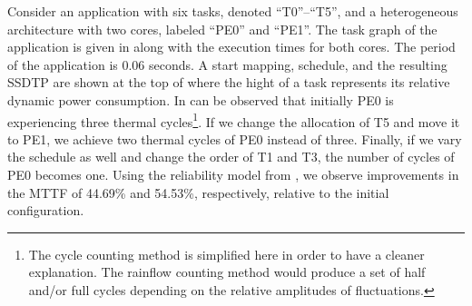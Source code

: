 Consider an application with six tasks, denoted ``T0''--``T5'', and a heterogeneous architecture with two cores, labeled ``PE0'' and ``PE1''. The task graph of the application is given in  along with the execution times for both cores. The period of the application is 0.06 seconds. A start mapping, schedule, and the resulting SSDTP are shown at the top of  where the hight of a task represents its relative dynamic power consumption. In can be observed that initially PE0 is experiencing three thermal cycles\footnote{The cycle counting method is simplified here in order to have a cleaner explanation. The rainflow counting method \cite{xiang2010} would produce a set of half and/or full cycles depending on the relative amplitudes of fluctuations.}. If we change the allocation of T5 and move it to PE1, we achieve two thermal cycles of PE0 instead of three. Finally, if we vary the schedule as well and change the order of T1 and T3, the number of cycles of PE0 becomes one. Using the reliability model from , we observe improvements in the MTTF of 44.69\% and 54.53\%, respectively, relative to the initial configuration.
